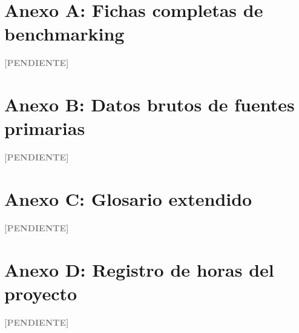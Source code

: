 \documentclass[12pt,a4paper]{article}
\newenvironment{pendiente}
  {\par\vspace{4pt}\noindent\textcolor{gray}{\textbf{[PENDIENTE]}}\par\begingroup\color{gray}\small}
  {\endgroup\par\vspace{4pt}}
\begin{document}
\section*{Anexo A: Fichas completas de benchmarking}
\begin{pendiente}
\end{pendiente}

\section*{Anexo B: Datos brutos de fuentes primarias}
\begin{pendiente}
\end{pendiente}

\section*{Anexo C: Glosario extendido}
\begin{pendiente}
\end{pendiente}

\section*{Anexo D: Registro de horas del proyecto}
\begin{pendiente}
\end{pendiente}

\end{document}
